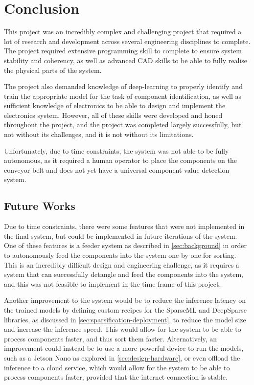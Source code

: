 \section{Conclusion}
\label{sec:conclusion}

This project was an incredibly complex and challenging project that required a lot of research and development across several engineering disciplines to complete. The project required extensive programming skill to complete to ensure system stability and coherency, as well as advanced CAD skills to be able to fully realise the physical parts of the system.

The project also demanded knowledge of deep-learning to properly identify and train the appropriate model for the task of component identification, as well as sufficient knowledge of electronics to be able to design and implement the electronics system. However, all of these skills were developed and honed throughout the project, and the project was completed largely successfully, but not without its challenges, and it is not without its limitations.

Unfortunately, due to time constraints, the system was not able to be fully autonomous, as it required a human operator to place the components on the conveyor belt and does not yet have a universal component value detection system.

\subsection{Future Works}
Due to time constraints, there were some features that were not implemented in the final system, but could be implemented in future iterations of the system. One of these features is a feeder system as described in \autoref{sec:background} in order to autonomously feed the components into the system one by one for sorting. This is an incredibly difficult design and engineering challenge, as it requires a system that can successfully detangle and feed the components into the system, and this was not feasible to implement in the time frame of this project.

Another improvement to the system would be to reduce the inference latency on the trained models by defining custom recipes for the SparseML and DeepSparse libraries, as discussed in \autoref{sec:sparsification-deployment}, to reduce the model size and increase the inference speed. This would allow for the system to be able to process components faster, and thus sort them faster. Alternatively, an improvement could instead be to use a more powerful device to run the models, such as a Jetson Nano as explored in \autoref{sec:design-hardware}, or even offload the inference to a cloud service, which would allow for the system to be able to process components faster, provided that the internet connection is stable.


